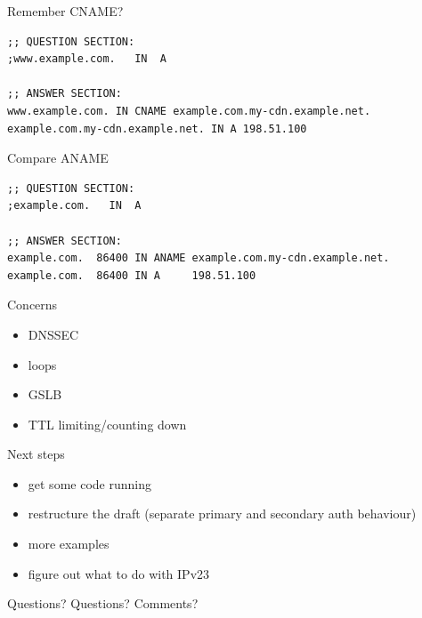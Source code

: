 \documentclass{beamer}
\begin{document}
\begin{frame}[fragile]{Remember CNAME?}
  \begin{verbatim}
;; QUESTION SECTION:
;www.example.com.   IN  A

;; ANSWER SECTION:
www.example.com. IN CNAME example.com.my-cdn.example.net.
example.com.my-cdn.example.net. IN A 198.51.100
  \end{verbatim}
\end{frame}

\begin{frame}[fragile]{Compare ANAME}
  \begin{verbatim}
;; QUESTION SECTION:
;example.com.   IN  A

;; ANSWER SECTION:
example.com.  86400 IN ANAME example.com.my-cdn.example.net.
example.com.  86400 IN A     198.51.100
  \end{verbatim}
\end{frame}

\begin{frame}{Concerns}
  \begin{itemize}
    \item DNSSEC
    \item loops
    \item GSLB
    \item TTL limiting/counting down
  \end{itemize}
\end{frame}

\begin{frame}{Next steps}
  \begin{itemize}
    \item get some code running
    \item restructure the draft (separate primary and secondary auth behaviour)
    \item more examples
    \item figure out what to do with IPv23
  \end{itemize}
\end{frame}

\begin{frame}{Questions?}
Questions? Comments?

\end{frame}
\end{document}
